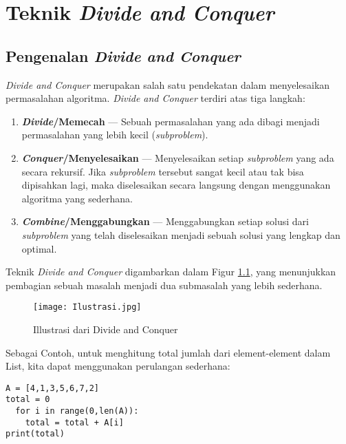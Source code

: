 \documentclass[12pt]{book}%
\begin{document}
\chapter{Teknik \textit{Divide and Conquer}}\label{ch:modul4}

\section{Pengenalan \textit{Divide and Conquer}}
\textit{Divide and Conquer} merupakan salah satu pendekatan dalam menyelesaikan permasalahan algoritma. \textit{Divide and Conquer} terdiri atas tiga langkah:
\begin{enumerate}
	\item \textbf{\textit{Divide}/Memecah} --- Sebuah permasalahan yang ada dibagi menjadi permasalahan yang lebih kecil (\textit{subproblem}).
	\item \textbf{\textit{Conquer}/Menyelesaikan} --- Menyelesaikan setiap \textit{subproblem} yang ada secara rekursif. Jika \textit{subproblem} tersebut sangat kecil atau tak bisa dipisahkan lagi, maka diselesaikan secara langsung dengan menggunakan algoritma yang sederhana.
	\item \textbf{\textit{Combine}/Menggabungkan} --- Menggabungkan setiap solusi dari \textit{subproblem} yang telah diselesaikan menjadi sebuah solusi yang lengkap dan optimal.
\end{enumerate}

Teknik \textit{Divide and Conquer} digambarkan dalam Figur \ref{fig:DivideandConquerIllustration}, yang menunjukkan pembagian sebuah masalah menjadi dua submasalah yang lebih sederhana.

\newpage{}
\begin{figure}[htbp]
\begin{center}
	\texttt{[image: Ilustrasi.jpg]}%
	\caption{Illustrasi dari Divide and Conquer}%
	\label{fig:DivideandConquerIllustration}%
\end{center}
\end{figure}

Sebagai Contoh, untuk menghitung total jumlah dari element-element dalam List, kita dapat menggunakan perulangan sederhana:



\lstset{language=Python}
\label{lst:SimpleSum}
\begin{lstlisting}[frame=single]
A = [4,1,3,5,6,7,2]
total = 0
  for i in range(0,len(A)):
    total = total + A[i]
print(total)
\end{lstlisting}
\end{document}
